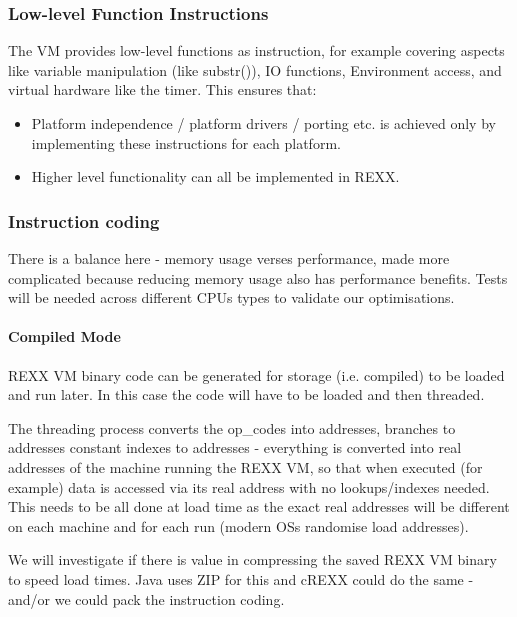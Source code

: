 \subsubsection{Low-level Function Instructions}

The VM provides low-level functions as instruction, for example covering
aspects like variable manipulation (like substr()), IO functions,
Environment access, and virtual hardware like the timer. This ensures that:

\begin{itemize}
\item Platform independence / platform drivers / porting etc. is
achieved only by implementing these instructions for each platform.

\item Higher level functionality can all be implemented in REXX.

\end{itemize}

\subsubsection{Instruction coding}

There is a balance here - memory usage verses performance, made more complicated
because reducing memory usage also has performance benefits. Tests will be
needed across different CPUs types to validate our optimisations.

\paragraph{Compiled Mode}

REXX VM binary code can be generated for storage (i.e. compiled) to be loaded
and run later. In this case the code will have to be loaded and then threaded.

The threading process converts the op\_codes into addresses, branches to addresses
constant indexes to addresses - everything is converted into real addresses
of the machine running the REXX VM, so that when executed (for example) data is
accessed via its real address with no lookups/indexes needed. This needs to
be all done at load time as the exact real addresses will be different on each machine
and for each run (modern OS\textquotesingle{}s randomise load addresses).

We will investigate if there is value in compressing the saved REXX VM binary
to speed load times. Java uses ZIP for this and cREXX could do the same - and/or
we could pack the instruction coding.

